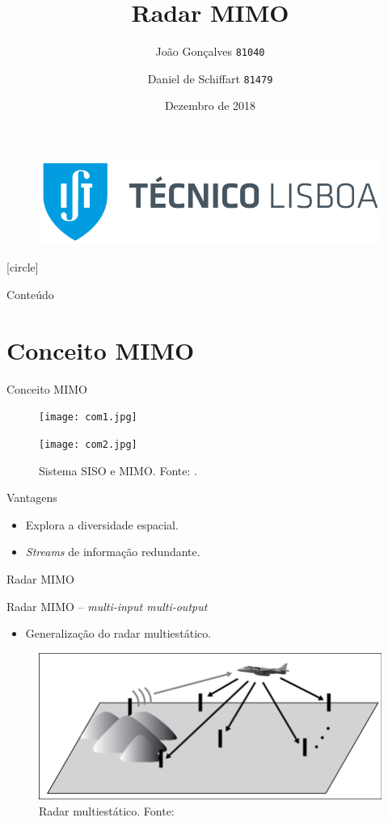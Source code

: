 \documentclass[portuguese]{beamer}
\title[Radar MIMO]{Radar MIMO}
\author[MEAer -- Sistemas de Radar]{
  João Gonçalves \texttt{81040} \and Daniel de Schiffart \texttt{81479} 
    }
\institute{Sistemas de Radar}
\date{Dezembro de 2018}
\begin{document}
\begin{frame}
    \begin{figure}
	\includegraphics[width=0.5\linewidth]{graphics/tecnico_logo.png}
    \end{figure}
    \titlepage
\end{frame}
[circle]
\begin{frame}{Conteúdo}
  \tableofcontents
\end{frame}

\section{Conceito MIMO}

\begin{frame}{Conceito MIMO}
  \begin{figure}[]
	\centering
	\begin{minipage}[t]{0.5\linewidth}
	  \centering
	  \texttt{[image: com1.jpg]}
    \end{minipage}%
    \begin{minipage}[t]{0.5\linewidth}	
	  \centering
	  \texttt{[image: com2.jpg]}
    \end{minipage}%
	\caption{Sistema SISO e MIMO. Fonte: \cite{swantennas}.}
	\label{fig:antenas}
  \end{figure}
  Vantagens
  \begin{itemize}
	\item Explora a diversidade espacial.
	\item \textit{Streams} de informação redundante.
  \end{itemize}
\end{frame}

\begin{frame}{Radar MIMO}
  \par
  {\large Radar MIMO -- \textit{multi-input multi-output}} 
  \begin{itemize}
	\item Generalização do radar multiestático.
  \end{itemize}
  \begin{figure}[]
	\centering
	\includegraphics[width=0.8\linewidth]{../report/graphics/multistatic.png}
	\caption{Radar multiestático. Fonte: \cite{mimoradarbook}}
	\label{fig:mono}
  \end{figure}
\end{frame}
\end{document}
